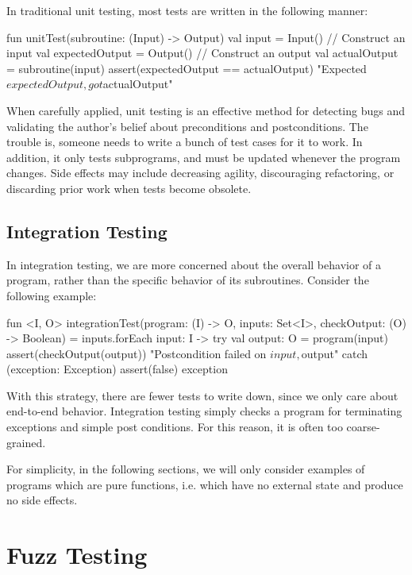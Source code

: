 \noindent In traditional unit testing, most tests are written in the following manner:
%
\begin{kotlinlisting}
fun unitTest(subroutine: (Input) -> Output) {
    val input = Input() // Construct an input
    val expectedOutput = Output() // Construct an output
    val actualOutput = subroutine(input)
    assert(expectedOutput == actualOutput) { "Expected $expectedOutput, got $actualOutput" }
}
\end{kotlinlisting}
%
When carefully applied, unit testing is an effective method for detecting bugs and validating the author's belief about preconditions and postconditions. The trouble is, someone needs to write a bunch of test cases for it to work. In addition, it only tests subprograms, and must be updated whenever the program changes. Side effects may include decreasing agility, discouraging refactoring, or discarding prior work when tests become obsolete.

\subsection{Integration Testing}

\noindent In integration testing, we are more concerned about the overall behavior of a program, rather than the specific behavior of its subroutines. Consider the following example:

\begin{kotlinlisting}
fun <I, O> integrationTest(program: (I) -> O, inputs: Set<I>, checkOutput: (O) -> Boolean) =
    inputs.forEach { input: I ->
        try {
            val output: O = program(input)
            assert(checkOutput(output)) { "Postcondition failed on $input, $output" }
        } catch (exception: Exception) {
            assert(false) { exception }
        }
    }
\end{kotlinlisting}
%
With this strategy, there are fewer tests to write down, since we only care about end-to-end behavior. Integration testing simply checks a program for terminating exceptions and simple post conditions. For this reason, it is often too coarse-grained.

For simplicity, in the following sections, we will only consider examples of programs which are pure functions, i.e. which have no external state and produce no side effects.

\section{Fuzz Testing}

